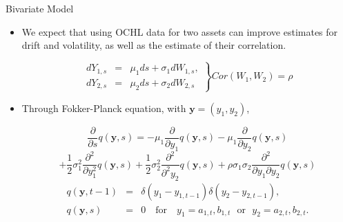 \documentclass{beamer}
\newcommand{\by} {\mathbf{y}}
\begin{document}
\begin{frame}{Bivariate Model}
	
	\begin{itemize}
		\item We expect that using OCHL data for two assets can improve estimates for drift and volatility, as well as the estimate of their correlation.

%
\[
	\left. \begin{array}{rcl}
			dY_{1,s} &=& \mu_1 ds + \sigma_1 dW_{1,s}, \\
			dY_{2,s} &=& \mu_2 ds + \sigma_2 dW_{2,s}
		\end{array} \right\} Cor(W_1, W_2) = \rho
\]

\item Through Fokker-Planck equation, with $\mathbf{y} = (y_1, y_2)$,

\begin{equation*}
	\frac{\partial}{\partial s} q(\by, s) = -\mu_1 \frac{\partial}{\partial y_1}q(\by,s) -\mu_1 \frac{\partial}{\partial y_2}q(\by,s)
\end{equation*}
\[ + \frac{1}{2}\sigma_1^2 \frac{\partial^2}{\partial y_1^2} q(\by,s) + \frac{1}{2} \sigma_2^2 \frac{\partial^2}{\partial^2 y_2}q(\by,s) + \rho \sigma_1 \sigma_2 \frac{\partial^2}{\partial y_1 \partial y_2} q(\by, s) \]
\begin{eqnarray*}
	q(\by, t-1) &=& \delta(y_1-y_{1,t-1})\delta(y_2-y_{2,t-1}), \label{eq:ch3-IC-BV-2} \\
	q(\by, s) &=& 0 \quad \mbox{for} \quad y_1 = a_{1,t}, b_{1,t} \,\, \mbox{ or } \,\, y_2 = a_{2,t}, b_{2,t}. \label{eq:ch3-IC-BV-3}
\end{eqnarray*}

\end{itemize}
\end{frame}
\end{document}
